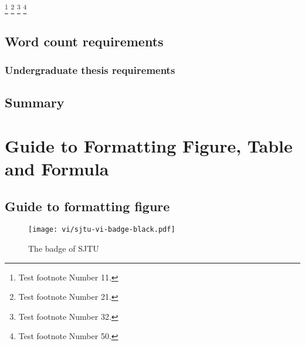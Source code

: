 \footnote[11]{Test footnote Number 11.}
\footnote[21]{Test footnote Number 21.}
\footnote[32]{Test footnote Number 32.}
\footnote[50]{Test footnote Number 50.}

\section{Word count requirements}

\subsection{Undergraduate thesis requirements}

\lipsum[5]

\section{Summary}

\lipsum[6]


\chapter{Guide to Formatting Figure, Table and Formula}

\section{Guide to formatting figure}

\begin{figure}[ht]
  \centering
  \texttt{[image: vi/sjtu-vi-badge-black.pdf]}
  \caption{The badge of SJTU}
  \label{fig:badge}
\end{figure}

